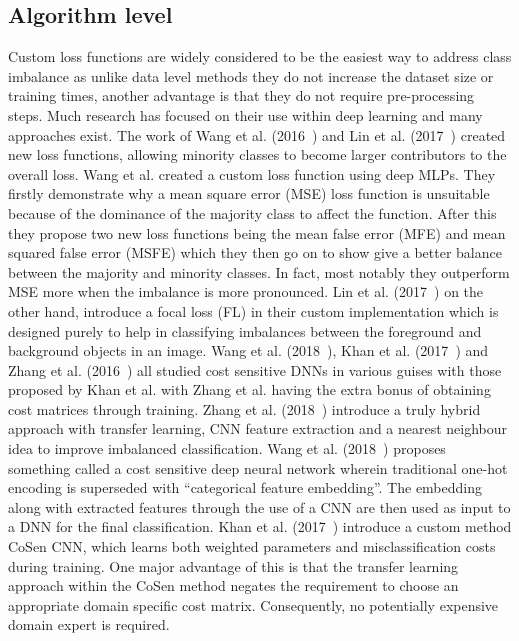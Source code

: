 \subsection{Algorithm level}\label{subsec:DeepLearningAlgoLevel}
Custom loss functions are widely considered to be the easiest way to address class imbalance as unlike data level methods they do not increase the dataset size or training times, another advantage is that they do not require pre-processing steps. Much research has focused on their use within deep learning and many approaches exist. The work of Wang et al. (2016~\cite{wang2016training}) and Lin et al. (2017~\cite{lin2017focal}) created new loss functions, allowing minority classes to become larger contributors to the overall loss. Wang et al. created a custom loss function using deep MLPs. They firstly demonstrate why a mean square error (MSE) loss function is unsuitable because of the dominance of the majority class to affect the function. After this they propose two new loss functions being the mean false error (MFE) and mean squared false error (MSFE) which they then go on to show give a better balance between the majority and minority classes. In fact, most notably they outperform MSE more when the imbalance is more pronounced. Lin et al. (2017~\cite{lin2017focal}) on the other hand, introduce a focal loss (FL) in their custom implementation which is designed purely to help in classifying imbalances between the foreground and background objects in an image. Wang et al. (2018~\cite{wang2018predicting}), Khan et al. (2017~\cite{khan2017cost}) and Zhang et al. (2016~\cite{zhang2016training}) all studied cost sensitive DNNs in various guises with those proposed by Khan et al. with Zhang et al. having the extra bonus of obtaining cost matrices through training. Zhang et al. (2018~\cite{zhang2018image}) introduce a truly hybrid approach with transfer learning, CNN feature extraction and a nearest neighbour idea to improve imbalanced classification. Wang et al. (2018~\cite{wang2018predicting}) proposes something called a cost sensitive deep neural network wherein traditional one-hot encoding is superseded with ``categorical feature embedding''. The embedding along with extracted features through the use of a CNN are then used as input to a DNN for the final classification. Khan et al. (2017~\cite{khan2017cost}) introduce a custom method CoSen CNN, which learns both weighted parameters and misclassification costs during training. One major advantage of this is that the transfer learning approach within the CoSen method negates the requirement to choose an appropriate domain specific cost matrix. Consequently, no potentially expensive domain expert is required. 
\par
